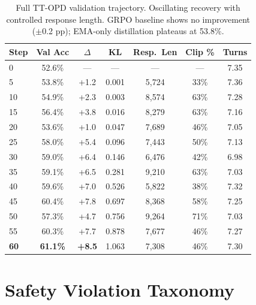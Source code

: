 \documentclass{article}
\begin{document}
\begin{table}[h]
\centering
\caption{Full TT-OPD validation trajectory. Oscillating recovery with controlled response length. GRPO baseline shows no improvement ($\pm$0.2 pp); EMA-only distillation plateaus at 53.8\%.}
\label{tab:opd_trajectory}
\small
\begin{tabular}{lcccccc}
\toprule
\textbf{Step} & \textbf{Val Acc} & \textbf{$\Delta$} & \textbf{KL} & \textbf{Resp.\ Len} & \textbf{Clip \%} & \textbf{Turns} \\
\midrule
0 & 52.6\% & --- & --- & --- & --- & 7.35 \\
5 & 53.8\% & +1.2 & 0.001 & 5,724 & 33\% & 7.36 \\
10 & 54.9\% & +2.3 & 0.003 & 8,574 & 63\% & 7.28 \\
15 & 56.4\% & +3.8 & 0.016 & 8,279 & 63\% & 7.16 \\
20 & 53.6\% & +1.0 & 0.047 & 7,689 & 46\% & 7.05 \\
25 & 58.0\% & +5.4 & 0.096 & 7,443 & 50\% & 7.13 \\
30 & 59.0\% & +6.4 & 0.146 & 6,476 & 42\% & 6.98 \\
35 & 59.1\% & +6.5 & 0.281 & 9,210 & 63\% & 7.03 \\
40 & 59.6\% & +7.0 & 0.526 & 5,822 & 38\% & 7.32 \\
45 & 60.4\% & +7.8 & 0.697 & 8,368 & 58\% & 7.25 \\
50 & 57.3\% & +4.7 & 0.756 & 9,264 & 71\% & 7.03 \\
55 & 60.3\% & +7.7 & 0.878 & 7,677 & 46\% & 7.27 \\
\textbf{60} & \textbf{61.1\%} & \textbf{+8.5} & 1.063 & 7,308 & 46\% & 7.30 \\
\bottomrule
\end{tabular}
\end{table}


\section{Safety Violation Taxonomy}
\label{app:safety}
\end{document}
